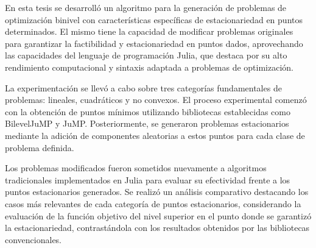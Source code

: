 \begin{conclusions}
    

    En esta tesis se desarrolló un algoritmo para la generación de problemas de optimización binivel con características específicas de estacionariedad en puntos determinados. El mismo tiene la capacidad de modificar problemas originales para garantizar la factibilidad y estacionariedad en puntos dados, aprovechando las capacidades del lenguaje de programación Julia, que destaca por su alto rendimiento computacional y sintaxis adaptada a problemas de optimización.
    
    La experimentación se llevó a cabo sobre tres categorías fundamentales de problemas: lineales, cuadráticos y no convexos. El proceso experimental comenzó con la obtención de puntos mínimos utilizando bibliotecas establecidas como BilevelJuMP y JuMP. Posteriormente, se generaron problemas estacionarios mediante la adición de componentes aleatorias a estos puntos para cada clase de problema definida.
    
    Los problemas modificados fueron sometidos nuevamente a algoritmos tradicionales implementados en Julia para evaluar su efectividad frente a los puntos estacionarios generados. Se realizó un análisis comparativo destacando los casos más relevantes de cada categoría de puntos estacionarios, considerando la evaluación de la función objetivo del nivel superior en el punto donde se garantizó la estacionariedad, contrastándola con los resultados obtenidos por las bibliotecas convencionales.
    

        
\end{conclusions}
